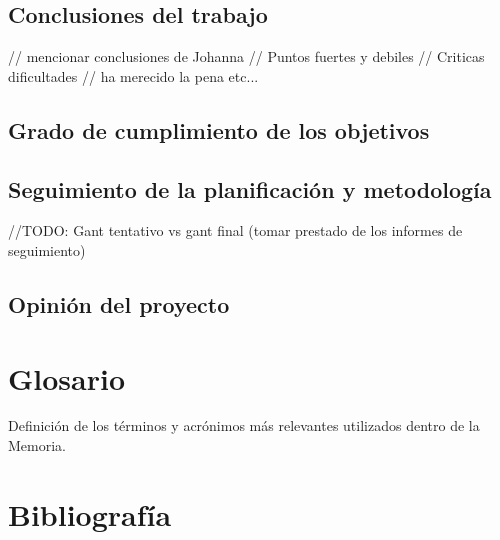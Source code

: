 \documentclass[11pt,a4paper]{article}
\begin{document}
\subsection{Conclusiones del trabajo}
// mencionar conclusiones de Johanna
// Puntos fuertes y debiles
// Criticas dificultades
// ha merecido la pena etc...
\medskip 

\subsection{Grado de cumplimiento de los objetivos}
\medskip 

\subsection{Seguimiento de la planificación y metodología}\label{sec:seguiminetoPlanificacion}
//TODO: Gant tentativo vs gant final (tomar prestado de los informes de seguimiento)
\medskip 

\subsection{Opinión del proyecto}
\newpage 


\section{Glosario}
\bigskip

Definición de los términos y acrónimos más relevantes utilizados dentro de la Memoria. 
\newpage 


\section{Bibliografía}
\bigskip
\end{document}
